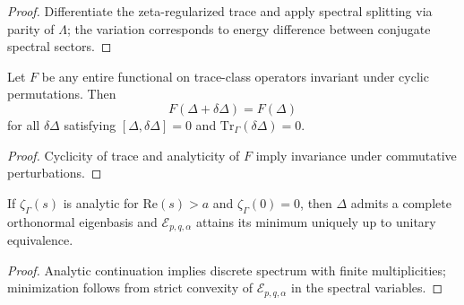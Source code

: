 \begin{proof}
Differentiate the zeta-regularized trace and apply spectral splitting via parity of $\Lambda$; the variation corresponds to energy difference between conjugate spectral sectors. \relax
\end{proof}


\begin{theorem}\label{thm:funct-invariance}
Let $F$ be any entire functional on trace-class operators invariant under cyclic permutations.
Then
\[
F(\Delta+\delta\Delta)=F(\Delta)
\]
for all $\delta\Delta$ satisfying $[\Delta,\delta\Delta]=0$ and $\mathrm{Tr}_\Gamma(\delta\Delta)=0$.
\end{theorem}

\begin{proof}
Cyclicity of trace and analyticity of $F$ imply invariance under commutative perturbations. \relax
\end{proof}

\begin{corollary}\label{cor:global-regularity}
If $\zeta_\Gamma(s)$ is analytic for $\mathrm{Re}(s)>a$ and $\zeta_\Gamma(0)=0$, then $\Delta$ admits a complete orthonormal eigenbasis and $\mathcal E_{p,q,\alpha}$ attains its minimum uniquely up to unitary equivalence.
\end{corollary}

\begin{proof}
Analytic continuation implies discrete spectrum with finite multiplicities; minimization follows from strict convexity of $\mathcal E_{p,q,\alpha}$ in the spectral variables. \relax
\end{proof}

